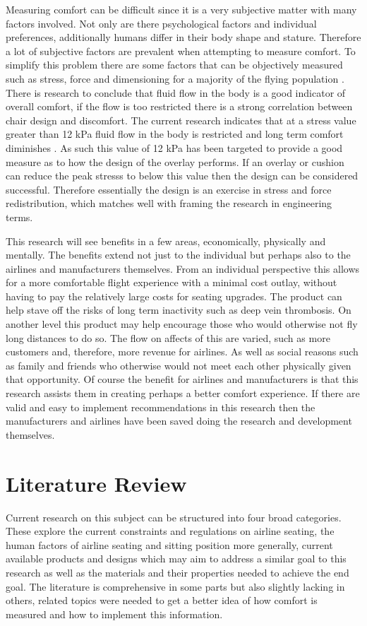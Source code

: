 \documentclass[conference]{IEEEtran}
\begin{document}
Measuring comfort can be difficult since it is a very subjective matter with many factors involved. Not only are there psychological factors and individual preferences, additionally humans differ in their body shape and stature. Therefore a lot of subjective factors are prevalent when attempting to measure comfort. To simplify this problem there are some factors that can be objectively measured such as stress, force and dimensioning for a majority of the flying population \cite{HermanMiller2013}. There is research to conclude that fluid flow in the body is a good indicator of overall comfort, if the flow is too restricted there is a strong correlation between chair design and discomfort. The current research indicates that at a stress value greater than 12 kPa fluid flow in the body is restricted and long term comfort diminishes \cite{Nigel2002}. As such this value of 12 kPa has been targeted to provide a good measure as to how the design of the overlay performs. If an overlay or cushion can reduce the peak stresss to below this value then the design can be considered successful. Therefore essentially the design is an exercise in stress and force redistribution, which matches well with framing the research in engineering terms.

This research will see benefits in a few areas, economically, physically and mentally. The benefits extend not just to the individual but perhaps also to the airlines and manufacturers themselves. From an individual perspective this allows for a more comfortable flight experience with a minimal cost outlay, without having to pay the relatively large costs for seating upgrades. The product can help stave off the risks of long term inactivity such as deep vein thrombosis. On another level this product may help encourage those who would otherwise not fly long distances to do so. The flow on affects of this are varied, such as more customers and, therefore, more revenue for airlines. As well as social reasons such as family and friends who otherwise would not meet each other physically given that opportunity. Of course the benefit for airlines and manufacturers is that this research assists them in creating perhaps a better comfort experience. If there are valid and easy to implement recommendations in this research then the manufacturers and airlines have been saved doing the research and development themselves.

\section{Literature Review}
Current research on this subject can be structured into four broad categories. These explore the current constraints and regulations on airline seating, the human factors of airline seating and sitting position more generally, current available products and designs which may aim to address a similar goal to this research as well as the materials and their properties needed to achieve the end goal. The literature is comprehensive in some parts but also slightly lacking in others, related topics were needed to get a better idea of how comfort is measured and how to implement this information.
    
\end{document}
